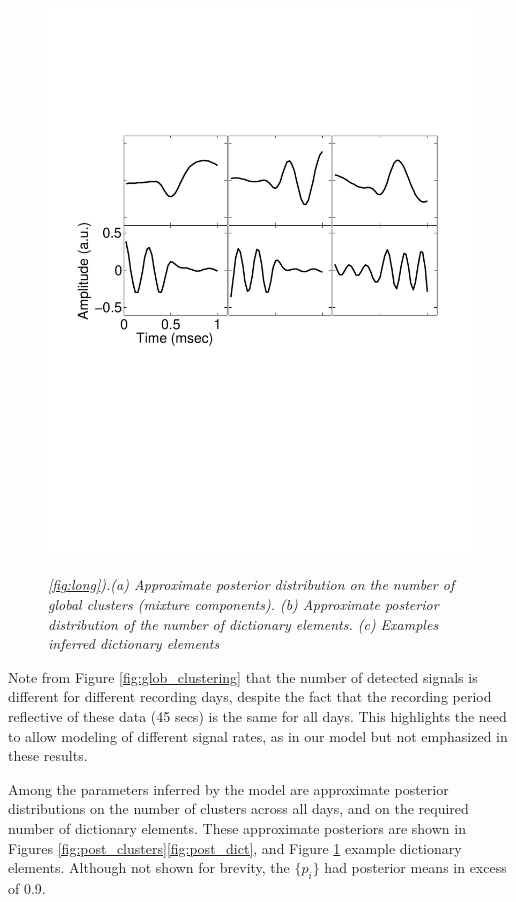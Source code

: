 \documentclass[journal]{IEEEtran}
\begin{document}
\begin{figure}[!htbp]
{   \includegraphics[width=1.0\linewidth] {figs_new/Dictionary_elements.pdf}
   \label{fig:dict_examples}
 }
  \caption{\small \emph{
 \ref{fig:long}).(a) Approximate posterior distribution on the number of global clusters (mixture components). (b) Approximate posterior distribution of the
number of dictionary elements. (c) Examples inferred
dictionary elements }}
\end{figure}


Note from Figure \ref{fig:glob_clustering} that the number of
detected signals is different for different recording days, despite
the fact that the recording period reflective of these data (45
secs) is the same for all days. This highlights the need to allow
modeling of different signal rates, as in our model but not
emphasized in these results.

Among the parameters inferred by the model are approximate posterior
distributions on the number of clusters across all days, and on the
required number of dictionary elements. These approximate posteriors
are shown in Figures \ref{fig:post_clusters}\ref{fig:post_dict},
and  Figure \ref{fig:dict_examples}  example dictionary
elements. Although not shown for brevity, the $\{p_i\}$ had posterior means in excess of 0.9.
\end{document}
